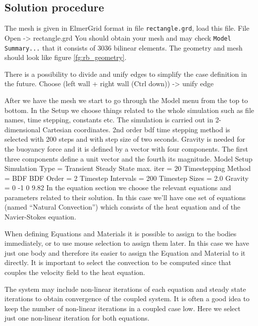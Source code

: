 \subsection*{Solution procedure}

The mesh is given in ElmerGrid format in file \texttt{rectangle.grd}, load this file.
\ttbegin
File 
  Open -> rectangle.grd
\ttend
You should obtain your mesh and may check \texttt{Model Summary...} that it consists 
of 3036 bilinear elements.  The geometry and mesh should look like 
figure \ref{fg:rb_geometry}.

There is a possibility to divide and unify edges to simplify the case definition in the future.
\ttbegin
Choose (left wall + right wall (Ctrl down)) -> unify edge
\ttend

After we have the mesh we start to go through the Model menu from the top to bottom. 
In the Setup we choose things related to the whole simulation such as file names, 
time stepping, constants etc.
The simulation is carried out in 2-dimensional Cartesian
coordinates. 2nd order bdf time stepping method is selected with 200 steps
and with step size of two seconds.
Gravity is needed for the buoyancy force and it is defined by a vector with four components. 
The first three components define a unit vector and the fourth its magnitude. 
\ttbegin
Model
  Setup 
    Simulation Type = Transient
    Steady State max. iter = 20
    Timestepping Method = BDF
    BDF Order = 2
    Timestep Intervals = 200
    Timestep Sizes = 2.0
    Gravity = 0 -1 0 9.82
\ttend
In the equation section we choose the relevant equations and parameters related to their solution. 
In this case we'll have one set of equations (named ``Natural Convection'') which 
consists of the heat equation and of the Navier-Stokes equation.

When defining Equations and Materials it is possible to assign to the bodies immediately, or to use mouse
selection to assign them later. In this case we have just one body and therefore its easier to assign 
the Equation and Material to it directly.
It is important to select the 
convection to be computed since that couples the velocity field to the heat equation.

The system may include non-linear iterations of each equation and steady state iterations 
to obtain convergence of the coupled system. It is often a good idea to keep the number of 
non-linear iterations in a coupled case low. Here we select just one non-linear iteration
for both equations.

